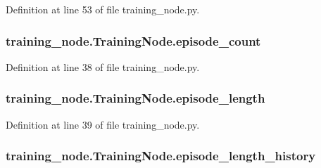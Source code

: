 Definition at line 53 of file training\+\_\+node.\+py.

\subsubsection[{\texorpdfstring{episode\+\_\+count}{episode_count}}]{\setlength{\rightskip}{0pt plus 5cm}training\+\_\+node.\+Training\+Node.\+episode\+\_\+count}\hypertarget{classtraining__node_1_1_training_node_a1f1839691d11a27b01271e1e4eda934f}{}\label{classtraining__node_1_1_training_node_a1f1839691d11a27b01271e1e4eda934f}


Definition at line 38 of file training\+\_\+node.\+py.

\subsubsection[{\texorpdfstring{episode\+\_\+length}{episode_length}}]{\setlength{\rightskip}{0pt plus 5cm}training\+\_\+node.\+Training\+Node.\+episode\+\_\+length}\hypertarget{classtraining__node_1_1_training_node_a79246dff36d3d3b28fe80923938dd8a1}{}\label{classtraining__node_1_1_training_node_a79246dff36d3d3b28fe80923938dd8a1}


Definition at line 39 of file training\+\_\+node.\+py.

\subsubsection[{\texorpdfstring{episode\+\_\+length\+\_\+history}{episode_length_history}}]{\setlength{\rightskip}{0pt plus 5cm}training\+\_\+node.\+Training\+Node.\+episode\+\_\+length\+\_\+history}\hypertarget{classtraining__node_1_1_training_node_aa2a3575522157d4d29ff2d22c8909037}{}\label{classtraining__node_1_1_training_node_aa2a3575522157d4d29ff2d22c8909037}


